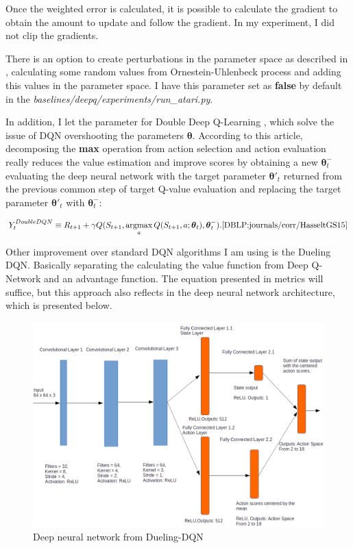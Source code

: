 \documentclass[11pt,twoside,a4paper]{article}
\DeclareMathOperator*{\argmax}{argmax}
\begin{document}
Once the weighted error is calculated, it is possible to calculate the gradient
to obtain the amount to update and follow the gradient. In my experiment, I did
not clip the gradients.

There is an option to create perturbations in the parameter space as described
in \cite{DBLP:journals/corr/PlappertHDSCCAA17}, calculating some random values
from Ornestein-Uhlenbeck process and adding this values in the parameter space.
I have this parameter set as \textbf{false} by default in the
\textit{baselines/deepq/experiments/run\_atari.py}.

In addition, I let the parameter for Double Deep Q-Learning
\cite{DBLP:journals/corr/HasseltGS15}, which solve the issue of DQN overshooting
the parameters $ \boldsymbol{\theta} $. According to this article, decomposing
the \textbf{max} operation from action selection and action evaluation really
reduces the value estimation and improve scores by obtaining a new
$ \boldsymbol{\theta}^{-}_{t} $ evaluating the deep neural network with the
target parameter $ \boldsymbol{\theta}'_{t} $ returned from the previous common
step of target Q-value evaluation and replacing the target parameter
$ \boldsymbol{\theta}'_{t} $ with $ \boldsymbol{\theta}^{-}_{t} $:

$$
Y^{DoubleDQN}_{t} \equiv R_{t + 1} +
\gamma Q(S_{t + 1},\argmax_{a} Q(S_{t + 1},a;\boldsymbol{\theta}_{t}),\boldsymbol{\theta}^{-}_{t}).
\cite{DBLP:journals/corr/HasseltGS15}
$$

Other improvement over standard DQN algorithms I am using is the Dueling DQN.
Basically separating the calculating the value function from Deep Q-Network and
an advantage function. The equation presented in metrics will suffice, but this
approach also reflects in the deep neural network architecture, which is
presented below.

\begin{figure}[h!]
  \includegraphics[width=\linewidth]{images/Dueling-DQN-architecture.png}
  \caption{Deep neural network from Dueling-DQN}
  \label{fig:dueling-dqn-architecture}
\end{figure}
\end{document}
